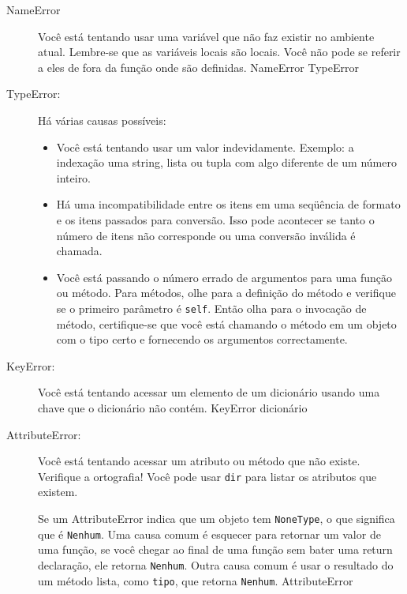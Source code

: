 \documentclass[10pt]{book}
\begin{document}
\begin{exercise}
\begin{v erbatim}
\begin{description}

\item[NameError] Você está tentando usar uma variável que não faz
existir no ambiente atual.
Lembre-se que as variáveis ​​locais são locais. Você
não pode se referir a eles de fora da função onde são definidas.
\index{} NameError
\index{} TypeError

\item[TypeError:] Há várias causas possíveis:

\begin{itemize}

\item Você está tentando usar um valor indevidamente. Exemplo: a indexação
uma string, lista ou tupla com algo diferente de um número inteiro.

\item Há uma incompatibilidade entre os itens em uma seqüência de formato e
os itens passados ​​para conversão. Isso pode acontecer se tanto o número
de itens não corresponde ou uma conversão inválida é chamada.

\item Você está passando o número errado de argumentos para uma função ou método.
Para métodos, olhe para a definição do método e
verifique se o primeiro parâmetro é {\tt self}. Então olha para o
invocação de método, certifique-se que você está chamando o método em um
objeto com o tipo certo e fornecendo os argumentos
correctamente.

\end{itemize}

\item[KeyError:] Você está tentando acessar um elemento de um dicionário
usando uma chave que o dicionário não contém.
\index{} KeyError
\index{} dicionário

\item[AttributeError:] Você está tentando acessar um atributo ou método
que não existe. Verifique a ortografia! Você pode usar
{\tt dir} para listar os atributos que existem.

Se um AttributeError indica que um objeto tem {\tt NoneType},
o que significa que é {\tt Nenhum}. Uma causa comum é esquecer
para retornar um valor de uma função, se você chegar ao final de
uma função sem bater uma {return \tt} declaração, ele retorna
{\tt Nenhum}. Outra causa comum é usar o resultado do
um método lista, como {\tt tipo}, que retorna {\tt Nenhum}.
\index{} AttributeError


\end{description}
\end{v erbatim}
\end{exercise}
\end{document}
